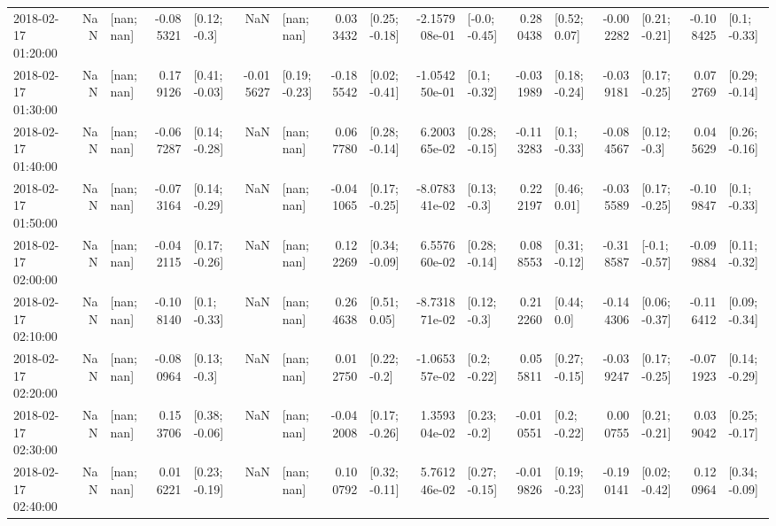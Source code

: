 \begin{tabular}{lrlrlrlrlrlrlrlrl}
2018-02-17 01:20:00 &       NaN &      [nan; nan] & -0.085321 &    [0.12; -0.3] &       NaN &      [nan; nan] &  0.033432 &   [0.25; -0.18] & -2.157908e-01 &   [-0.0; -0.45] &  0.280438 &    [0.52; 0.07] & -0.002282 &   [0.21; -0.21] & -0.108425 &    [0.1; -0.33] \\
2018-02-17 01:30:00 &       NaN &      [nan; nan] &  0.179126 &   [0.41; -0.03] & -0.015627 &   [0.19; -0.23] & -0.185542 &   [0.02; -0.41] & -1.054250e-01 &    [0.1; -0.32] & -0.031989 &   [0.18; -0.24] & -0.039181 &   [0.17; -0.25] &  0.072769 &   [0.29; -0.14] \\
2018-02-17 01:40:00 &       NaN &      [nan; nan] & -0.067287 &   [0.14; -0.28] &       NaN &      [nan; nan] &  0.067780 &   [0.28; -0.14] &  6.200365e-02 &   [0.28; -0.15] & -0.113283 &    [0.1; -0.33] & -0.084567 &    [0.12; -0.3] &  0.045629 &   [0.26; -0.16] \\
2018-02-17 01:50:00 &       NaN &      [nan; nan] & -0.073164 &   [0.14; -0.29] &       NaN &      [nan; nan] & -0.041065 &   [0.17; -0.25] & -8.078341e-02 &    [0.13; -0.3] &  0.222197 &    [0.46; 0.01] & -0.035589 &   [0.17; -0.25] & -0.109847 &    [0.1; -0.33] \\
2018-02-17 02:00:00 &       NaN &      [nan; nan] & -0.042115 &   [0.17; -0.26] &       NaN &      [nan; nan] &  0.122269 &   [0.34; -0.09] &  6.557660e-02 &   [0.28; -0.14] &  0.088553 &   [0.31; -0.12] & -0.318587 &   [-0.1; -0.57] & -0.099884 &   [0.11; -0.32] \\
2018-02-17 02:10:00 &       NaN &      [nan; nan] & -0.108140 &    [0.1; -0.33] &       NaN &      [nan; nan] &  0.264638 &    [0.51; 0.05] & -8.731871e-02 &    [0.12; -0.3] &  0.212260 &     [0.44; 0.0] & -0.144306 &   [0.06; -0.37] & -0.116412 &   [0.09; -0.34] \\
2018-02-17 02:20:00 &       NaN &      [nan; nan] & -0.080964 &    [0.13; -0.3] &       NaN &      [nan; nan] &  0.012750 &    [0.22; -0.2] & -1.065357e-02 &    [0.2; -0.22] &  0.055811 &   [0.27; -0.15] & -0.039247 &   [0.17; -0.25] & -0.071923 &   [0.14; -0.29] \\
2018-02-17 02:30:00 &       NaN &      [nan; nan] &  0.153706 &   [0.38; -0.06] &       NaN &      [nan; nan] & -0.042008 &   [0.17; -0.26] &  1.359304e-02 &    [0.23; -0.2] & -0.010551 &    [0.2; -0.22] &  0.000755 &   [0.21; -0.21] &  0.039042 &   [0.25; -0.17] \\
2018-02-17 02:40:00 &       NaN &      [nan; nan] &  0.016221 &   [0.23; -0.19] &       NaN &      [nan; nan] &  0.100792 &   [0.32; -0.11] &  5.761246e-02 &   [0.27; -0.15] & -0.019826 &   [0.19; -0.23] & -0.190141 &   [0.02; -0.42] &  0.120964 &   [0.34; -0.09] \\

\end{tabular}

